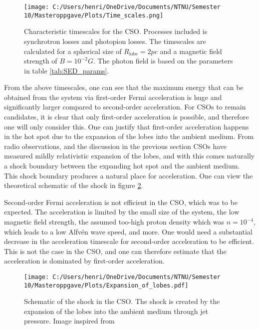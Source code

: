 \begin{figure}[H]
    \centering
    \texttt{[image: C:/Users/henri/OneDrive/Documents/NTNU/Semester 10/Masteroppgave/Plots/Time\_scales.png]}
    \caption{Characteristic timescales for the CSO. Processes included is synchrotron losses and photopion losses. The timescales are calculated for a spherical size of $R_{\text{lobe}} = 2 pc$ and a magnetic field strength of $B = 10^{-2} G$. The photon field is based on the parameters in table \ref{tab:SED_params}.}
    \label{fig:timescales}
\end{figure}

From the above timescales, one can see that the maximum energy that can be obtained from the system via first-order Fermi acceleration is huge and significantly larger compared to second-order acceleration. For CSOs to remain candidates, it is clear that only first-order acceleration is possible, and therefore one will only consider this. One can justify that first-order acceleration happens in the hot spot due to the expansion of the lobes into the ambient medium. From radio observations, and the discussion in the previous section CSOs have measured mildly relativistic expansion of the lobes, and with this comes naturally a shock boundary between the expanding hot spot and the ambient medium. This shock boundary produces a natural place for acceleration. One can view the theoretical schematic of the shock in figure \ref{fig:CSO_shock}.

Second-order Fermi acceleration is not efficient in the CSO, which was to be expected. The acceleration is limited by the small size of the system, the low magnetic field strength, the assumed too-high proton density which was $n=10^{-4}$, which leads to a low Alfvén wave speed, and more. One would need a substantial decrease in the acceleration timescale for second-order acceleration to be efficient. This is not the case in the CSO, and one can therefore estimate that the acceleration is dominated by first-order acceleration.

\begin{figure}[H]
    \centering
    \texttt{[image: C:/Users/henri/OneDrive/Documents/NTNU/Semester 10/Masteroppgave/Plots/Expansion\_of\_lobes.pdf]}
    \caption{Schematic of the shock in the CSO. The shock is created by the expansion of the lobes into the ambient medium through jet pressure. Image inspired from \cite{Perucho_2002}}
    \label{fig:CSO_shock}
\end{figure}


